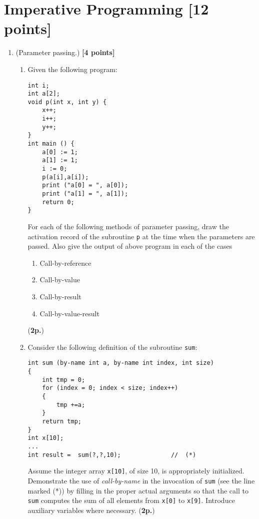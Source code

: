 \documentclass{article}
\begin{document}
\section{Imperative Programming [12 points]}

\begin{enumerate}
\item (Parameter passing.) 
\hfill{\textbf{[4 points]}}
\begin{enumerate}
\item Given  the following program:

{\small
\begin{verbatim}
int i;
int a[2];
void p(int x, int y) {
    x++;
    i++;
    y++;
}
int main () {
    a[0] := 1;
    a[1] := 1;
    i := 0;
    p(a[i],a[i]);
    print ("a[0] = ", a[0]);
    print ("a[1] = ", a[1]);
    return 0;
}
\end{verbatim}
}

For each of the following methods of parameter passing,
draw the activation record of the subroutine \texttt{p} at the time when
the parameters are passed. Also give the output of above program
in each of the cases

\begin{enumerate}\itemsep=0.0cm
\item Call-by-reference
\item Call-by-value
\item Call-by-result
\item Call-by-value-result
\end{enumerate}
 (\textbf{2p.})
\item Consider the following definition of the 
subroutine \texttt{sum}: 

{\small 
\begin{verbatim}
int sum (by-name int a, by-name int index, int size)
{
    int tmp = 0;
    for (index = 0; index < size; index++)
    {
        tmp +=a;
    }
    return tmp;
}
int x[10];
...
int result =  sum(?,?,10);              //  (*)   
\end{verbatim}
}
 Assume the integer array \texttt{x[10]}, of size 10, is appropriately
initialized. Demonstrate the use of \textit{call-by-name} in the invocation of
\texttt{sum} (see the line marked (*)) by filling in the
proper actual arguments so that the call to \texttt{sum} computes
the sum of all elements from \texttt{x[0]} to \texttt{x[9]}. 
Introduce auxiliary variables where necessary. (\textbf{2p.})
\\
\end{enumerate} 


\end{enumerate}
\end{document}
